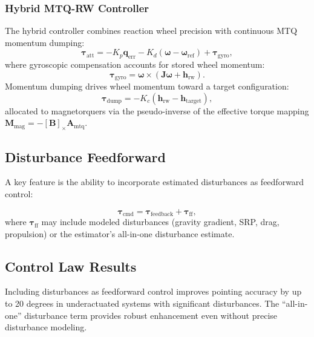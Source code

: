 \documentclass[conference]{IEEEtran}
\begin{document}
\subsubsection{Hybrid MTQ-RW Controller}
The hybrid controller combines reaction wheel precision with continuous MTQ momentum dumping:
\begin{equation}
\boldsymbol{\tau}_{\text{att}} = -K_p \mathbf{q}_{\text{err}} - K_d(\boldsymbol{\omega} - \boldsymbol{\omega}_{\text{ref}}) + \boldsymbol{\tau}_{\text{gyro}},
\end{equation}
where gyroscopic compensation accounts for stored wheel momentum:
\begin{equation}
\boldsymbol{\tau}_{\text{gyro}} = \boldsymbol{\omega} \times (\mathbf{J}\boldsymbol{\omega} + \mathbf{h}_{\text{rw}}).
\end{equation}
Momentum dumping drives wheel momentum toward a target configuration:
\begin{equation}
\boldsymbol{\tau}_{\text{dump}} = -K_c(\mathbf{h}_{\text{rw}} - \mathbf{h}_{\text{target}}),
\end{equation}
allocated to magnetorquers via the pseudo-inverse of the effective torque mapping $\mathbf{M}_{\text{mag}} = -[\mathbf{B}]_\times \mathbf{A}_{\text{mtq}}$.

\subsection{Disturbance Feedforward}\label{subsec:disturbance_ff}

A key feature is the ability to incorporate estimated disturbances as feedforward control:

\begin{equation}
\boldsymbol{\tau}_{\text{cmd}} = \boldsymbol{\tau}_{\text{feedback}} + \boldsymbol{\tau}_{\text{ff}},
\end{equation}
where $\boldsymbol{\tau}_{\text{ff}}$ may include modeled disturbances (gravity gradient, SRP, drag, propulsion) or the estimator's all-in-one disturbance estimate.


\subsection{Control Law Results}\label{subsec:control_results}

Including disturbances as feedforward control improves pointing accuracy by up to 20 degrees in underactuated systems with significant disturbances. The ``all-in-one'' disturbance term provides robust enhancement even without precise disturbance modeling.
\end{document}
